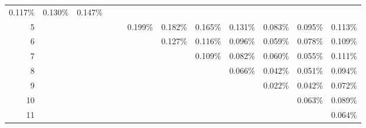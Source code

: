 \documentclass{article}
\begin{document}
\begin{table}[h!]
{\begin{tabular}{rlllllllllll}
  \cellcolor[HTML]{FCC57C}0.117\% &
  \cellcolor[HTML]{FDD17F}0.130\% &
  \cellcolor[HTML]{FEE282}0.147\% \\
\multicolumn{1}{r|}{5} &
   &
   &
   &
   &
  \cellcolor[HTML]{EEE683}0.199\% &
  \cellcolor[HTML]{F5E884}0.182\% &
  \cellcolor[HTML]{FCEA84}0.165\% &
  \cellcolor[HTML]{FDD37F}0.131\% &
  \cellcolor[HTML]{FBA476}0.083\% &
  \cellcolor[HTML]{FBAF78}0.095\% &
  \cellcolor[HTML]{FCC17B}0.113\% \\
\multicolumn{1}{r|}{6} &
   &
   &
   &
   &
   &
  \cellcolor[HTML]{FDCE7E}0.127\% &
  \cellcolor[HTML]{FCC37C}0.116\% &
  \cellcolor[HTML]{FBB178}0.096\% &
  \cellcolor[HTML]{F98D71}0.059\% &
  \cellcolor[HTML]{FA9E75}0.078\% &
  \cellcolor[HTML]{FCBC7B}0.109\% \\
\multicolumn{1}{r|}{7} &
   &
   &
   &
   &
   &
   &
  \cellcolor[HTML]{FCBD7B}0.109\% &
  \cellcolor[HTML]{FBA376}0.082\% &
  \cellcolor[HTML]{FA8E72}0.060\% &
  \cellcolor[HTML]{F98871}0.055\% &
  \cellcolor[HTML]{FCBF7B}0.111\% \\
\multicolumn{1}{r|}{8} &
   &
   &
   &
   &
   &
   &
   &
  \cellcolor[HTML]{FA9373}0.066\% &
  \cellcolor[HTML]{F97C6E}0.042\% &
  \cellcolor[HTML]{F98570}0.051\% &
  \cellcolor[HTML]{FBAF78}0.094\% \\
\multicolumn{1}{r|}{9} &
   &
   &
   &
   &
   &
   &
   &
   &
  \cellcolor[HTML]{F8696B}0.022\% &
  \cellcolor[HTML]{F97D6E}0.042\% &
  \cellcolor[HTML]{FA9A74}0.072\% \\
\multicolumn{1}{r|}{10} &
   &
   &
   &
   &
   &
   &
   &
   &
   &
  \cellcolor[HTML]{FA9072}0.063\% &
  \cellcolor[HTML]{FBA977}0.089\% \\
\multicolumn{1}{r|}{11} &
   &
   &
   &
   &
   &
   &
   &
   &
   &
   &
  \cellcolor[HTML]{FA9172}0.064\%
\end{tabular}%
}
\end{table}
\end{document}
